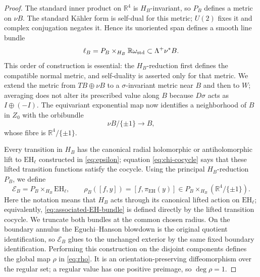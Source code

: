 \documentclass[11pt]{article}
\theoremstyle{remark}\newtheorem{remark}[theorem]{Remark}
\newcommand{\EH}{\mathrm{EH}}
\newcommand{\R}{\mathbb R}
\begin{document}
\begin{proof}
The standard inner product on $\R^4$ is $H_B$-invariant, so $P_B$ defines
a metric on $\nu B$.  The standard K\"ahler form is self-dual for this
metric; $U(2)$ fixes it and complex conjugation negates it.  Hence its
unoriented span defines a smooth line bundle
\[
 \ell_B=P_B\times_{H_B}\R\omega_{\rm std}
 \subset\Lambda^+\nu^*B.
\]
This order of construction is essential: the $H_B$-reduction first
defines the compatible normal metric, and self-duality is asserted only
for that metric.  We extend the metric from $TB\oplus\nu B$ to a
$\sigma$-invariant metric near $B$ and then to $W$; averaging does not
alter its prescribed value along $B$ because $D\sigma$ acts as
$I\oplus(-I)$.  The equivariant exponential map now identifies a
neighborhood of $B$ in $Z_0$ with the orbibundle
\begin{equation}\label{eq:normal-orbibundle}
 \nu B/\{\pm1\}\longrightarrow B,
\end{equation}
whose fibre is $\R^4/\{\pm1\}$.

Every transition in $H_B$ has the canonical radial
holomorphic or antiholomorphic lift to $\EH_\ell$ constructed in
\eqref{eq:epsilon}; equation \eqref{eq:chi-cocycle} says that these lifted
transition functions satisfy the cocycle.  Using the principal
$H_B$-reduction $P_B$, we define
\begin{equation}\label{eq:associated-EH-bundle}
 \mathcal E_B=P_B\times_{H_B}\EH_\ell,
 \qquad
 \rho_B([f,y])=[f,\pi_{\EH}(y)]
   \in P_B\times_{H_B}(\R^4/\{\pm1\}).
\end{equation}
Here the notation means that $H_B$ acts through its canonical lifted
action on $\EH_\ell$; equivalently, \eqref{eq:associated-EH-bundle} is
defined directly by the lifted transition cocycle.  We truncate both
bundles at the common chosen radius.  On the boundary annulus the Eguchi--Hanson
blowdown is the original quotient identification, so $\mathcal E_B$ glues
to the unchanged exterior by the same fixed boundary identification.  Performing
this construction on the disjoint components defines the global map
$\rho$ in \eqref{eq:rho}.  It is an orientation-preserving diffeomorphism
over the regular set; a regular value has one positive preimage, so
$\deg\rho=1$.


\end{proof}
\end{document}
